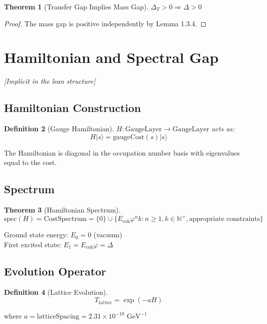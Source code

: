 \documentclass[11pt]{article}
\numberwithin{equation}{section}
\newtheorem{theorem}{Theorem}[section]
\newtheorem{definition}[theorem]{Definition}
\theoremstyle{remark}
\newcommand{\Ecoh}{E_{\text{coh}}}
\newcommand{\massGap}{\Delta}
\newcommand{\transferGap}{\Delta_T}
\newcommand{\N}{\mathbb{N}}
\begin{document}
\begin{theorem}[Transfer Gap Implies Mass Gap]
$\transferGap > 0 \Rightarrow \massGap > 0$
\end{theorem}

\begin{proof}
The mass gap is positive independently by Lemma 1.3.4.
\end{proof}

\section{Hamiltonian and Spectral Gap}
\textit{[Implicit in the lean structure]}

\subsection{Hamiltonian Construction}

\begin{definition}[Gauge Hamiltonian]
$H : \text{GaugeLayer} \to \text{GaugeLayer}$ acts as:
\[H|s\rangle = \text{gaugeCost}(s)|s\rangle\]
\end{definition}

The Hamiltonian is diagonal in the occupation number basis with eigenvalues equal to the cost.

\subsection{Spectrum}

\begin{theorem}[Hamiltonian Spectrum]
\[\text{spec}(H) = \text{CostSpectrum} = \{0\} \cup \{\Ecoh \varphi^n k : n \geq 1, k \in \N^+, \text{appropriate constraints}\}\]
\end{theorem}

Ground state energy: $E_0 = 0$ (vacuum)\\
First excited state: $E_1 = \Ecoh \varphi = \massGap$

\subsection{Evolution Operator}

\begin{definition}[Lattice Evolution]
\[T_{\text{lattice}} = \exp(-a H)\]
\end{definition}

where $a = \text{latticeSpacing} = 2.31 \times 10^{-19} \text{ GeV}^{-1}$
\end{document}
